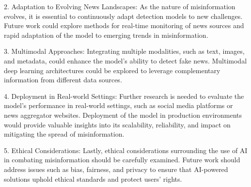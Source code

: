 2. Adaptation to Evolving News Landscapes: As the nature of misinformation evolves, it is essential to continuously adapt detection models to new challenges. Future work could explore methods for real-time monitoring of news sources and rapid adaptation of the model to emerging trends in misinformation.

3. Multimodal Approaches: Integrating multiple modalities, such as text, images, and metadata, could enhance the model's ability to detect fake news. Multimodal deep learning architectures could be explored to leverage complementary information from different data sources.

4. Deployment in Real-world Settings: Further research is needed to evaluate the model's performance in real-world settings, such as social media platforms or news aggregator websites. Deployment of the model in production environments would provide valuable insights into its scalability, reliability, and impact on mitigating the spread of misinformation.

5. Ethical Considerations: Lastly, ethical considerations surrounding the use of AI in combating misinformation should be carefully examined. Future work should address issues such as bias, fairness, and privacy to ensure that AI-powered solutions uphold ethical standards and protect users' rights.

 